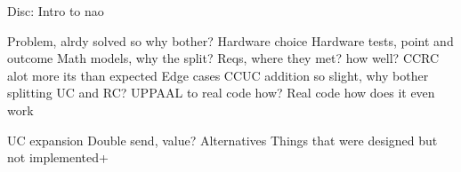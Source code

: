 Disc: Intro to nao

Problem, alrdy solved so why bother?
Hardware choice
Hardware tests, point and outcome
Math models, why the split?
Reqs, where they met? how well?
CCRC alot more its than expected
Edge cases
CCUC addition so slight, why bother splitting UC and RC?
UPPAAL to real code how?
Real code how does it even work

UC expansion
Double send, value?
Alternatives
Things that were designed but not implemented+

